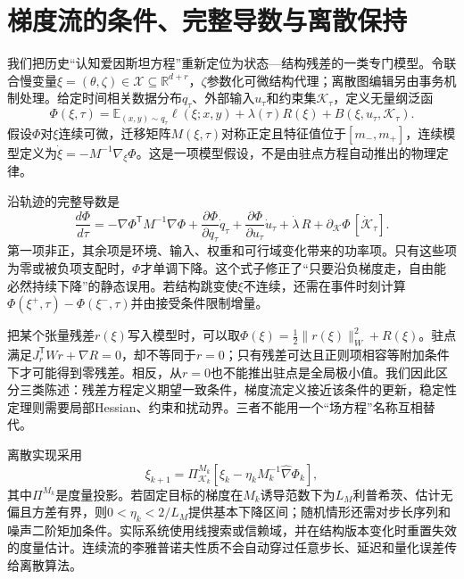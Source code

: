 \section{梯度流的条件、完整导数与离散保持}
\label{sec:cefe_as_gradient_flow}

我们把历史“认知爱因斯坦方程”重新定位为状态—结构残差的一类专门模型。令联合慢变量$\xi=(\theta,\zeta)\in\mathcal X\subseteq\mathbb R^{d+r}$，$\zeta$参数化可微结构代理；离散图编辑另由事务机制处理。给定时间相关数据分布$q_\tau$、外部输入$u_\tau$和约束集$\mathcal K_\tau$，定义无量纲泛函
\begin{equation}
\Phi(\xi,\tau)=\mathbb E_{(x,y)\sim q_\tau}\ell(\xi;x,y)
+\lambda(\tau)R(\xi)+B(\xi,u_\tau,\mathcal K_\tau).
\end{equation}
假设$\Phi$对$\xi$连续可微，迁移矩阵$M(\xi,\tau)$对称正定且特征值位于$[m_-,m_+]$，连续模型定义为$\dot\xi=-M^{-1}\nabla_\xi\Phi$。这是一项模型假设，不是由驻点方程自动推出的物理定律。

沿轨迹的完整导数是
\begin{equation}
\frac{d\Phi}{d\tau}=-\nabla\Phi^{\mathsf T}M^{-1}\nabla\Phi
+\frac{\partial\Phi}{\partial q_\tau}\dot q_\tau
+\frac{\partial\Phi}{\partial u_\tau}\dot u_\tau
+\dot\lambda\,R+\partial_{\mathcal K}\Phi\,[\dot{\mathcal K}_\tau].
\end{equation}
第一项非正，其余项是环境、输入、权重和可行域变化带来的功率项。只有这些项为零或被负项支配时，$\Phi$才单调下降。这个式子修正了“只要沿负梯度走，自由能必然持续下降”的静态误用。若结构跳变使$\xi$不连续，还需在事件时刻计算$\Phi(\xi^+,\tau)-\Phi(\xi^-,\tau)$并由接受条件限制增量。

把某个张量残差$r(\xi)$写入模型时，可以取$\Phi(\xi)=\frac12\|r(\xi)\|_W^2+R(\xi)$。驻点满足$J_r^{\mathsf T}Wr+\nabla R=0$，却不等同于$r=0$；只有残差可达且正则项相容等附加条件下才可能得到零残差。相反，从$r=0$也不能推出驻点是全局极小值。我们因此区分三类陈述：残差方程定义期望一致条件，梯度流定义接近该条件的更新，稳定性定理则需要局部Hessian、约束和扰动界。三者不能用一个“场方程”名称互相替代。

离散实现采用
\begin{equation}
\xi_{k+1}=\Pi_{\mathcal K_k}^{M_k}\left[
\xi_k-\eta_kM_k^{-1}\widehat\nabla\Phi_k\right],
\end{equation}
其中$\Pi^{M_k}$是度量投影。若固定目标的梯度在$M_k$诱导范数下为$L_M$利普希茨、估计无偏且方差有界，则$0<\eta_k<2/L_M$提供基本下降区间；随机情形还需对步长序列和噪声二阶矩加条件。实际系统使用线搜索或信赖域，并在结构版本变化时重置失效的度量估计。连续流的李雅普诺夫性质不会自动穿过任意步长、延迟和量化误差传给离散算法。

